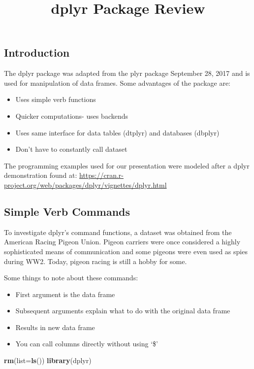 \documentclass[]{article}
\title{dplyr Package Review}
\author{}
\date{}
\newenvironment{Shaded}{\begin{snugshade}}{\end{snugshade}}
\newcommand{\KeywordTok}[1]{\textcolor[rgb]{0.13,0.29,0.53}{\textbf{#1}}}
\newcommand{\DataTypeTok}[1]{\textcolor[rgb]{0.13,0.29,0.53}{#1}}
\newcommand{\NormalTok}[1]{#1}
\providecommand{\tightlist}{%
  \setlength{\itemsep}{0pt}\setlength{\parskip}{0pt}}
\begin{document}
\maketitle

\subsection{Introduction}\label{introduction}

The dplyr package was adapted from the plyr package September 28, 2017
and is used for manipulation of data frames. Some advantages of the
package are:

\begin{itemize}
\tightlist
\item
  Uses simple verb functions
\item
  Quicker computations- uses backends
\item
  Uses same interface for data tables (dtplyr) and databases (dbplyr)
\item
  Don't have to constantly call dataset
\end{itemize}

The programming examples used for our presentation were modeled after a
dplyr demonstration found at:
\url{https://cran.r-project.org/web/packages/dplyr/vignettes/dplyr.html}

\subsection{Simple Verb Commands}\label{simple-verb-commands}

To investigate dplyr's command functions, a dataset was obtained from
the American Racing Pigeon Union. Pigeon carriers were once considered a
highly sophisticated means of communication and some pigeons were even
used as spies during WW2. Today, pigeon racing is still a hobby for
some.

Some things to note about these commands:

\begin{itemize}
\tightlist
\item
  First argument is the data frame
\item
  Subsequent arguments explain what to do with the original data frame
\item
  Results in new data frame
\item
  You can call columns directly without using `\$'
\end{itemize}

\begin{Shaded}
\begin{Highlighting}[]
\KeywordTok{rm}\NormalTok{(}\DataTypeTok{list=}\KeywordTok{ls}\NormalTok{())}
\KeywordTok{library}\NormalTok{(dplyr)}
\end{Highlighting}
\end{Shaded}
\end{document}
